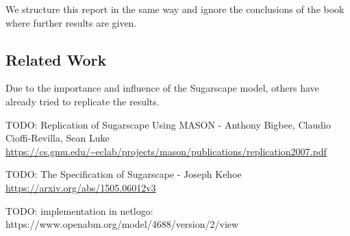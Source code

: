 We structure this report in the same way and ignore the conclusions of the book where further results are given.

\subsection{Related Work}
Due to the importance and influence of the Sugarscape model, others have already tried to replicate the results.

TODO: \cite{bigbee_replication_2007} Replication of Sugarscape Using MASON - Anthony Bigbee, Claudio Cioffi-Revilla, Sean Luke  \url{https://cs.gmu.edu/~eclab/projects/mason/publications/replication2007.pdf} 

TODO: \cite{kehoe_specification_2015} The Specification of Sugarscape - Joseph Kehoe \url{https://arxiv.org/abs/1505.06012v3}

TODO: implementation in netlogo: https://www.openabm.org/model/4688/version/2/view
